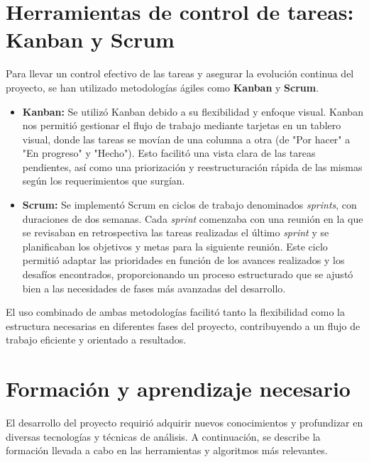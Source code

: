 
\section{Herramientas de control de tareas: Kanban y Scrum}

Para llevar un control efectivo de las tareas y asegurar la evolución continua del proyecto, se han utilizado metodologías ágiles como \textbf{Kanban} y \textbf{Scrum}.

\begin{itemize}
    \item \textbf{Kanban:} Se utilizó Kanban debido a su flexibilidad y enfoque visual. Kanban nos permitió gestionar el flujo de trabajo mediante tarjetas en un tablero visual, donde las tareas se movían de una columna a otra (de "Por hacer" a "En progreso" y "Hecho"). Esto facilitó una vista clara de las tareas pendientes, así como una priorización y reestructuración rápida de las mismas según los requerimientos que surgían.
    
    \item \textbf{Scrum:} Se implementó Scrum en ciclos de trabajo denominados \textit{sprints}, con duraciones de dos semanas. Cada \textit{sprint} comenzaba con una reunión en la que se revisaban en retrospectiva las tareas realizadas el último \textit{sprint} y se planificaban los objetivos y metas para la siguiente reunión. Este ciclo permitió adaptar las prioridades en función de los avances realizados y los desafíos encontrados, proporcionando un proceso estructurado que se ajustó bien a las necesidades de fases más avanzadas del desarrollo.
\end{itemize}

El uso combinado de ambas metodologías facilitó tanto la flexibilidad como la estructura necesarias en diferentes fases del proyecto, contribuyendo a un flujo de trabajo eficiente y orientado a resultados.

\section{Formación y aprendizaje necesario}

El desarrollo del proyecto requirió adquirir nuevos conocimientos y profundizar en diversas tecnologías y técnicas de análisis. A continuación, se describe la formación llevada a cabo en las herramientas y algoritmos más relevantes.

